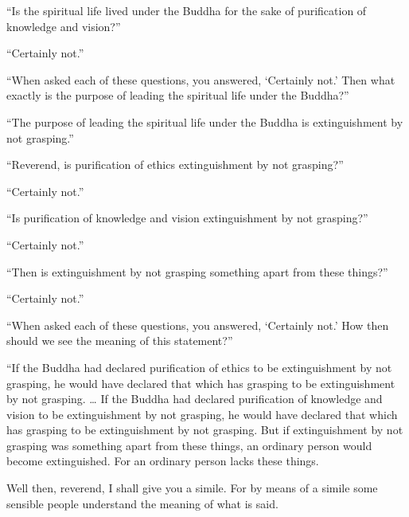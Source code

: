 \documentclass[12pt,openany]{book}%
\begin{document}
“Is the spiritual life lived under the Buddha for the sake of purification of knowledge and vision?” 

“Certainly not.” 

“When asked each of these questions, you answered, ‘Certainly not.’ Then what exactly is the purpose of leading the spiritual life under the Buddha?” 

“The purpose of leading the spiritual life under the Buddha is extinguishment by not grasping.” 

“Reverend, is purification of ethics extinguishment by not grasping?” 

“Certainly not.” 

“Is purification of knowledge and vision extinguishment by not grasping?” 

“Certainly not.” 

“Then is extinguishment by not grasping something apart from these things?” 

“Certainly not.” 

“When asked each of these questions, you answered, ‘Certainly not.’ How then should we see the meaning of this statement?” 

“If the Buddha had declared purification of ethics to be extinguishment by not grasping, he would have declared that which has grasping to be extinguishment by not grasping. … If the Buddha had declared purification of knowledge and vision to be extinguishment by not grasping, he would have declared that which has grasping to be extinguishment by not grasping. But if extinguishment by not grasping was something apart from these things, an ordinary person would become extinguished. For an ordinary person lacks these things. 

Well then, reverend, I shall give you a simile. For by means of a simile some sensible people understand the meaning of what is said. 
\end{document}
